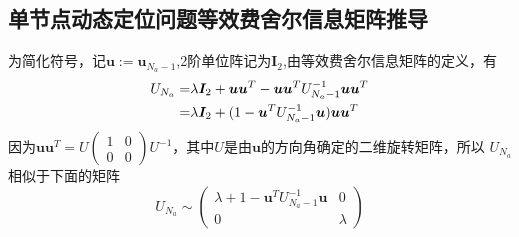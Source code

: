 \subsection{单节点动态定位问题等效费舍尔信息矩阵推导}\label{B_F_1}
为简化符号，记$\bm{u}:=\bm{u}_{N_a-1}$,2阶单位阵记为$\bm{I}_2$,由等效费舍尔信息矩阵的定义，有
\begin{align}\notag\label{eq:initial_efim}
  U_{N_a}=&\lambda \bm{I}_2+\bm{u}\bm{u}^T-\bm{u}\bm{u}^T U_{N_a-1}^{-1}\bm{u}\bm{u}^T\\
  =&\lambda \bm{I}_2+(1-\bm{u}^T U_{N_a-1}^{-1}\bm{u})\bm{u}\bm{u}^T
\end{align}
因为$\bm{u}\bm{u}^T=U\begin{pmatrix}
                     1 & 0 \\
                     0 & 0
                   \end{pmatrix}U^{-1}$，其中$U$是由$\bm{u}$的方向角确定的二维旋转矩阵，所以
$U_{N_a}$相似于下面的矩阵
\[
U_{N_a}\sim \begin{pmatrix}
                           \lambda+1-\bm{u}^T U_{N_a-1}^{-1}\bm{u} & 0 \\
                           0 & \lambda
                         \end{pmatrix}
\]
                         
